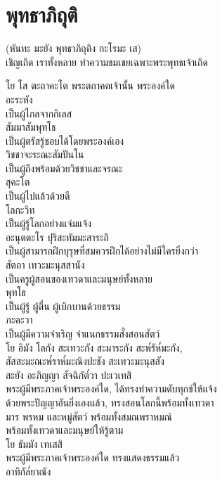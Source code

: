 \documentclass{article}
\begin{document}
\section{พุทธาภิถุติ}
\begin{center}
(หันทะ มะยัง พุทธาภิถุติง กะโรมะ เส)\\
เชิญเถิด เราทั้งหลาย ทำความชมเชยเฉพาะพระพุทธเจ้าเถิด
\end{center}
โย โส ตะถาคะโต\newline
\indent พระตถาคตเจ้านั้น พระองค์ใด\\
อะระหัง\\
\indent เป็นผู้ไกลจากกิเลส\\
สัมมาสัมพุทโธ\\
\indent เป็นผู้ตรัสรู้ชอบได้โดยพระองค์เอง\\
วิชชาจะระณะสัมปันโน\\
\indent เป็นผู้ถึงพร้อมด้วยวิชชาและจรณะ\\
สุคะโต\\
\indent เป็นผู้ไปแล้วด้วยดี\\
โลกะวิท\\
\indent เป็นผู้รู้โลกอย่างแจ่มแจ้ง\\
อะนุตตะโร ปุริสะทัมมะสาระถิ\\
\indent เป็นผู้สามารถฝึกบุรุษที่สมควรฝึกได้อย่างไม่มีใครยิ่งกว่า\\
สัตถา เทวะมะนุสสานัง\\
\indent เป็นครูผู้สอนของเทวดาและมนุษย์ทั้งหลาย\\
พุทโธ\\
\indent เป็นผู้รู้ ผู้ตื่น ผู้เบิกบานด้วยธรรม\\
ภะคะวา\\
\indent เป็นผู้มีความจำเริญ จำแนกธรรมสั่งสอนสัตว์\\
โย อิมัง โลกัง สะเทวะกัง สะมาระกัง สะพ๎รัห๎มะกัง, \\
สัสสะมะณะพ๎ราห๎มะณิงปะชัง สะเทวะมะนุสสัง\\
 สะยัง อะภิญญา สัจฉิกัต๎วา ปะเวเทสิ\\
\indent พระผู้มีพระภาคเจ้าพระองค์ใด, ได้ทรงทำความดับทุกข์ให้แจ้ง \\
ด้วยพระปัญญาอันยิ่งเองแล้ว, ทรงสอนโลกนี้พร้อมทั้งเทวดา \\
มาร พรหม และหมู่สัตว์ พร้อมทั้งสมณพราหมณ์\\
พร้อมทั้งเทวดาและมนุษย์ให้รู้ตาม\\
โย ธัมมัง เทเสสิ\\
\indent พระผู้มีพระภาคเจ้าพระองค์ใด ทรงแสดงธรรมแล้ว\\
อาทิกัล๎ยาณัง\\
\end{document}
